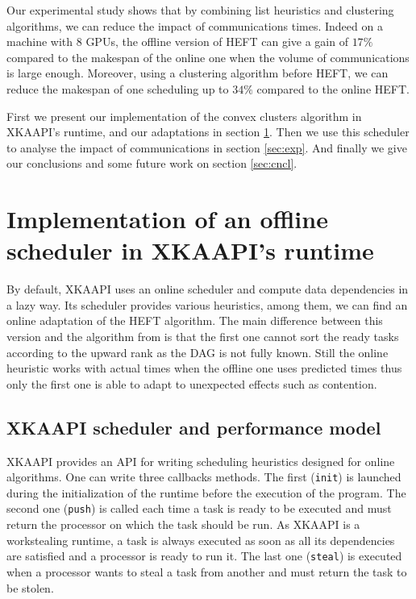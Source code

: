 \documentclass[10pt, conference, compsocconf,pdftex,dvipsnames]{IEEEtran}
\begin{document}
Our experimental study shows that by combining list heuristics and clustering
algorithms, we can reduce the impact of communications times. Indeed on a
machine with 8 GPUs, the offline version of HEFT can give a gain of $17\%$
compared to the makespan of the online one when the volume of communications
is large enough.  Moreover, using a clustering algorithm before HEFT, we can
reduce the makespan of one scheduling up to $34\%$ compared to the online
HEFT.

First we present our implementation of the convex clusters algorithm in
XKAAPI's runtime, and our adaptations  in section \ref{sec:impl}. Then we use
this scheduler to analyse the impact of communications in section
\ref{sec:exp}. And finally we give our conclusions and some future work on
section \ref{sec:cncl}.

\section{Implementation of an offline scheduler in XKAAPI's runtime}
\label{sec:impl}

By default, XKAAPI uses an online scheduler and compute data dependencies in a
lazy way. Its scheduler provides various heuristics, among them, we can find
an online adaptation of the HEFT algorithm. The main difference between this
version and the algorithm from \cite{topcuoglu2002performance} is that the
first one cannot sort the ready tasks according to the upward rank as the DAG
is not fully known.  Still the online heuristic works with actual times when
the offline one uses predicted times thus only the first one is able to adapt
to unexpected effects such as contention.

\subsection{XKAAPI scheduler and performance model}
\label{sec:impl-kaapi}

XKAAPI provides an API for writing scheduling heuristics designed for online
algorithms. One can write three callbacks methods. The first (\texttt{init})
is launched during the initialization of the runtime before the execution of
the program.  The second one (\texttt{push}) is called each time a task is
ready to be executed and must return the processor on which the task should
be run. As XKAAPI is a workstealing runtime, a task is always executed as soon
as all its dependencies are satisfied and a processor is ready to run it. The
last one (\texttt{steal}) is executed when a processor wants to steal a task
from another and must return the task to be stolen.
\end{document}
